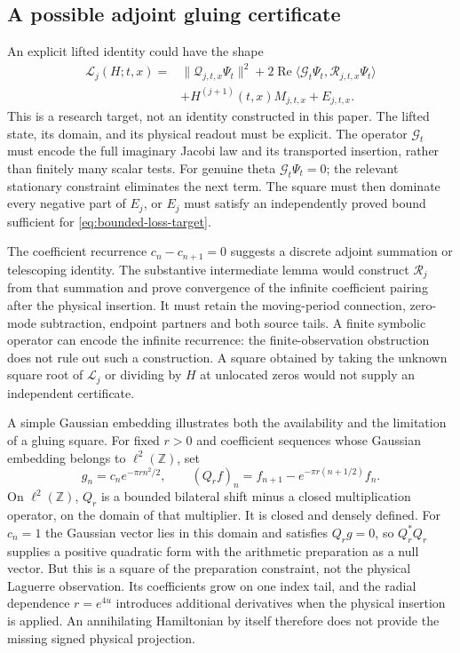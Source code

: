 \documentclass[11pt]{article}
\numberwithin{equation}{section}
\theoremstyle{definition}
\theoremstyle{remark}
\DeclareMathOperator{\Rea}{Re}
\begin{document}
\subsection{A possible adjoint gluing certificate}
An explicit lifted identity could have the shape
\begin{equation}\label{eq:open-adjoint-gluing}
\begin{split}
 \mathscr L_j(H;t,x)={}&\|\mathcal Q_{j,t,x}\Psi_t\|^2
 +2\Rea\langle\mathcal G_t\Psi_t,
                  \mathcal R_{j,t,x}\Psi_t\rangle\\
 &+H^{(j+1)}(t,x)M_{j,t,x}+E_{j,t,x}.
\end{split}
\end{equation}
This is a research target, not an identity constructed in this paper.
The lifted state, its domain, and its physical readout must be explicit.
The operator $\mathcal G_t$ must encode the full imaginary Jacobi law
and its transported insertion, rather than finitely many scalar tests.
For genuine theta $\mathcal G_t\Psi_t=0$; the relevant stationary
constraint eliminates the next term. The square must then dominate every
negative part of $E_j$, or $E_j$ must satisfy an independently proved
bound sufficient for \eqref{eq:bounded-loss-target}.

The coefficient recurrence $c_n-c_{n+1}=0$ suggests a discrete adjoint
summation or telescoping identity. The substantive intermediate lemma
would construct $\mathcal R_j$ from that summation and prove convergence
of the infinite coefficient pairing after the physical insertion. It must
retain the moving-period connection, zero-mode subtraction, endpoint
partners and both source tails. A finite symbolic operator can encode the
infinite recurrence: the finite-observation obstruction does not rule out
such a construction. A square obtained by taking the unknown square root
of $\mathscr L_j$ or dividing by $H$ at unlocated zeros would not supply
an independent certificate.

A simple Gaussian embedding illustrates both the availability and the
limitation of a gluing square. For fixed $r>0$ and coefficient sequences whose Gaussian embedding
belongs to $\ell^2(\mathbb Z)$, set
\begin{equation}
 g_n=c_n e^{-\pi rn^2/2},\qquad
 (Q_rf)_n=f_{n+1}-e^{-\pi r(n+1/2)}f_n.
 \label{eq:gluing-weighted-shift}
\end{equation}
On $\ell^2(\mathbb Z)$, $Q_r$ is a bounded bilateral shift minus a
closed multiplication operator, on the domain of that multiplier.
It is closed and densely defined. For $c_n=1$ the Gaussian vector lies
in this domain and satisfies $Q_rg=0$, so $Q_r^*Q_r$ supplies a positive
quadratic form with the arithmetic preparation as a null vector.
But this is a square of the preparation constraint, not the physical
Laguerre observation. Its coefficients grow on one index tail, and the
radial dependence $r=e^{4u}$ introduces additional derivatives when the
physical insertion is applied. An annihilating Hamiltonian by itself
therefore does not provide the missing signed physical projection.
\end{document}
